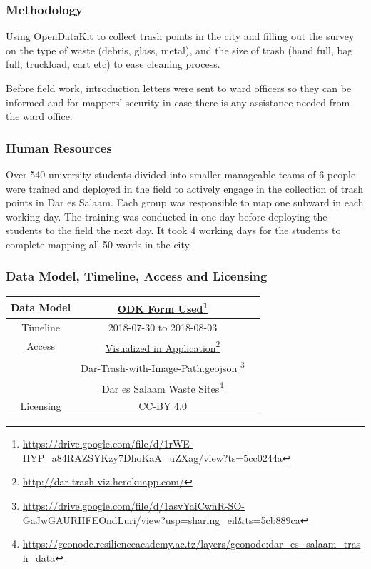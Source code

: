 \documentclass[a4paper,12pt,twoside]{article}
\begin{document}
\subsubsection{Methodology}
Using OpenDataKit to collect trash points in the city and filling out the survey on the type of waste (debris, glass, metal), and the size of trash (hand full, bag full, truckload, cart etc) to ease cleaning process.

Before field work, introduction letters were sent to ward officers so they can be informed and for mappers’ security in case there is any assistance needed from the ward office.

\subsubsection{Human Resources}
Over 540 university students divided into smaller manageable teams of 6 people were trained and deployed in the field to actively engage in the collection of trash points in Dar es Salaam. Each group was responsible to map one subward in each working day. The training was conducted in one day before deploying the students to the field the next day.
It took 4 working days for the students to complete mapping all 50 wards in the city.

\subsubsection{Data Model, Timeline, Access and Licensing}
\begin{center}
\begin{tabular}{|c|c|c|}  

 \hline
Data Model &
\href{https://drive.google.com/file/d/1rWE-HYP_a84RAZSYKzy7DhoKaA_uZXag/view?ts=5cc0244a}{ODK Form Used}\footnote{\url{https://drive.google.com/file/d/1rWE-HYP_a84RAZSYKzy7DhoKaA_uZXag/view?ts=5cc0244a}} \\
 \hline
  Timeline  &  2018-07-30 to 2018-08-03 \\
\hline  
Access & {\href{http://dar-trash-viz.herokuapp.com/}{Visualized in Application}\footnote{\url{http://dar-trash-viz.herokuapp.com/}}}\\
{} & {\href{https://drive.google.com/file/d/1asvYaiCwnR-SO-GaJwGAURHFEOndLuri/view?usp=sharing_eil&ts=5cb889ca}{Dar-Trash-with-Image-Path.geojson} \footnote{\url{https://drive.google.com/file/d/1asvYaiCwnR-SO-GaJwGAURHFEOndLuri/view?usp=sharing_eil&ts=5cb889ca}}}\\
{} & \href{https://geonode.resilienceacademy.ac.tz/layers/geonode:dar_es_salaam_trash_data}{Dar es Salaam Waste Sites}\footnote{\url{https://geonode.resilienceacademy.ac.tz/layers/geonode:dar_es_salaam_trash_data}}\\
\hline
Licensing & CC-BY 4.0\\
\hline

\end{tabular}
\end{center}
\end{document}
